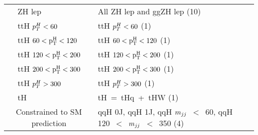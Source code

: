 \begin{tabular}{c|ll}
   & ZH lep & All ZH lep and ggZH lep (10) \\  [\cmsTabSkip]
   & ttH $p_T^H<\rm{60}$ & ttH $p_T^H<\rm{60}$ (1) \\ 
   & ttH $\rm{60}<p_T^H<\rm{120}$ & ttH $\rm{60}<p_T^H<\rm{120}$ (1) \\ 
   & ttH $\rm{120}<p_T^H<\rm{200}$ & ttH $\rm{120}<p_T^H<\rm{200}$ (1) \\ 
   & ttH $\rm{200}<p_T^H<\rm{300}$ & ttH $\rm{200}<p_T^H<\rm{300}$ (1) \\ 
   & ttH $p_T^H>\rm{300}$ & ttH $p_T^H>\rm{300}$ (1) \\  [\cmsTabSkip]
   & tH & tH~=~tHq~+~tHW (1) \\
  \hline
  \multicolumn{2}{c}{Constrained to SM prediction} & qqH 0J, qqH 1J, qqH $m_{jj}$~$<$~60, qqH 120~$<$~$m_{jj}$~$<$~350 (4) \\
\end{tabular}
